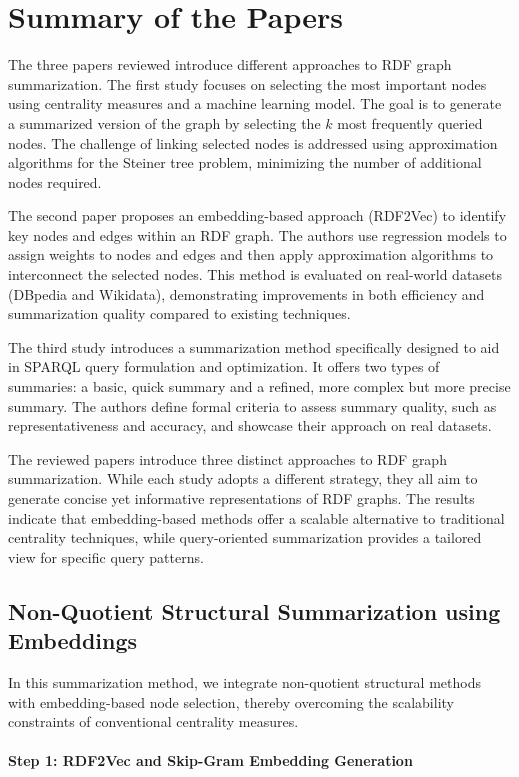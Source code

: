 \documentclass[article,submit,pdftex,moreauthors]{Definitions/mdpi}
\begin{document}
\section{Summary of the Papers}

The three papers reviewed introduce different approaches to RDF graph summarization. The first study focuses on selecting the most important nodes using centrality measures and a machine learning model. The goal is to generate a summarized version of the graph by selecting the \(k\) most frequently queried nodes. The challenge of linking selected nodes is addressed using approximation algorithms for the Steiner tree problem, minimizing the number of additional nodes required.

The second paper proposes an embedding-based approach (RDF2Vec) to identify key nodes and edges within an RDF graph. The authors use regression models to assign weights to nodes and edges and then apply approximation algorithms to interconnect the selected nodes. This method is evaluated on real-world datasets (DBpedia and Wikidata), demonstrating improvements in both efficiency and summarization quality compared to existing techniques.

The third study introduces a summarization method specifically designed to aid in SPARQL query formulation and optimization. It offers two types of summaries: a basic, quick summary and a refined, more complex but more precise summary. The authors define formal criteria to assess summary quality, such as representativeness and accuracy, and showcase their approach on real datasets.

The reviewed papers introduce three distinct approaches to RDF graph summarization. While each study adopts a different strategy, they all aim to generate concise yet informative representations of RDF graphs. The results indicate that embedding-based methods offer a scalable alternative to traditional centrality techniques, while query-oriented summarization provides a tailored view for specific query patterns.

\newpage
\subsection{Non-Quotient Structural Summarization using Embeddings}
In this summarization method, we integrate non-quotient structural methods with embedding-based node selection, thereby overcoming the scalability constraints of conventional centrality measures.

\paragraph{Step 1: RDF2Vec and Skip-Gram Embedding Generation}
\end{document}

